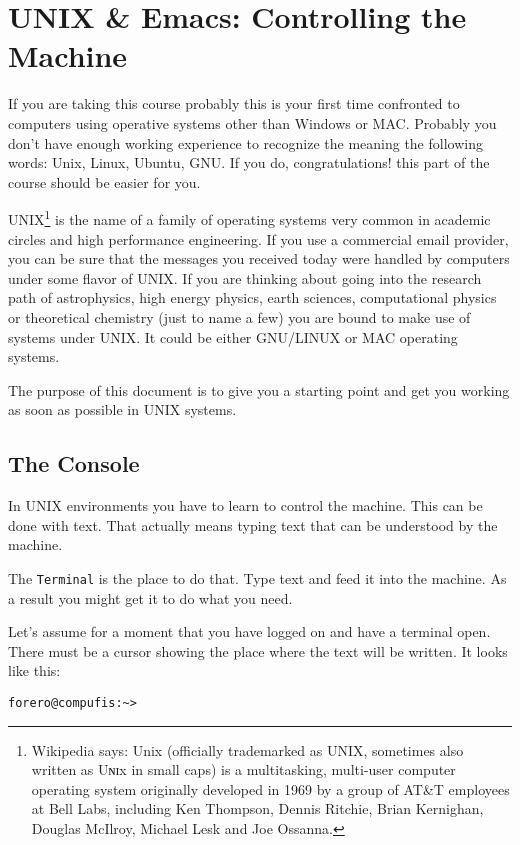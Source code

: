 \documentclass{article}
\begin{document}
\section{UNIX \& Emacs: Controlling the Machine}

If you are taking this course probably this is your first time confronted to computers using operative systems other than Windows or MAC. Probably you don't have enough working experience to recognize the meaning the following words: Unix, Linux, Ubuntu, GNU. If you do, congratulations! this part of the course should be easier for you.

UNIX\footnote{Wikipedia says: Unix (officially trademarked as UNIX, sometimes also written as Uɴɪx in small caps) is a multitasking, multi-user computer operating system originally developed in 1969 by a group of AT\&T employees at Bell Labs, including Ken Thompson, Dennis Ritchie, Brian Kernighan, Douglas McIlroy, Michael Lesk and Joe Ossanna.} is the name of a family of operating systems very common in academic circles and high performance engineering. If you use a commercial email provider, you can be sure that the messages you received today were handled by computers under some flavor of UNIX. If you are thinking about going into the research path of astrophysics, high energy physics, earth sciences, computational physics or theoretical chemistry (just to name a few) you are bound to make use of systems under UNIX. It could be either GNU/LINUX or MAC operating systems.

The purpose of this document is to give you a starting point and get you working as soon as possible in UNIX systems.

\subsection{The Console}
In UNIX environments you have to learn to control the machine. This can be done with text. That actually means typing text that can be understood by the machine.

The {\tt Terminal} is the place to do that. Type text and feed it into the machine. As a result you might get it to do what you need. 

Let's assume for a moment that you have logged on and have a terminal open. There must be a cursor showing the place where the text will be written. It looks like this:

\begin{verbatim}
forero@compufis:~>
\end{verbatim}
\end{document}
